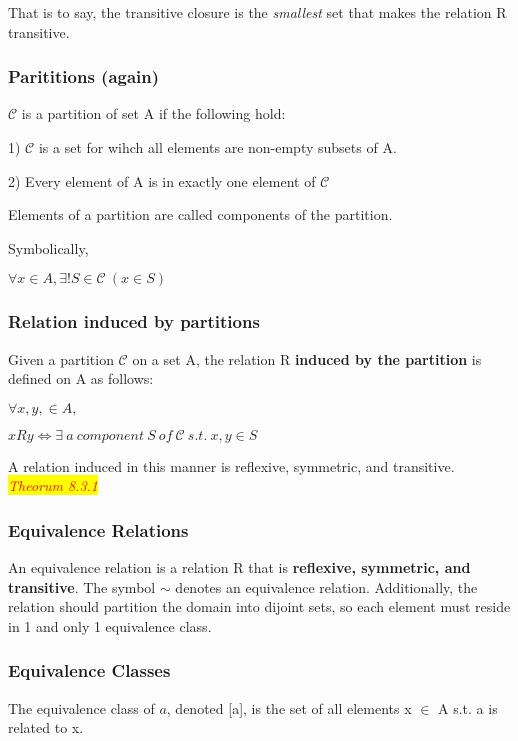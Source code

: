 \documentclass{article}
\newcommand{\theorum}[1]{\quad \quad \colorbox{yellow}{\textit{\textcolor{red}{Theorum #1}}}}
\begin{document}
\vspace{10pt}

That is to say, the transitive closure is the \textit{smallest} set that makes the relation R transitive.

\subsubsection{Parititions (again)}
$\mathcal{C}$ is a partition of set A if the following hold:

1) $\mathcal{C}$ is a set for wihch all elements are non-empty subsets of A.

2) Every element of A is in exactly one element of $\mathcal{C}$

Elements of a partition are called components of the partition.

Symbolically,
\begin{center}
    $\forall x \in A, \exists!S\in\mathcal{C}\ (x \in S)$
\end{center}

\subsubsection{Relation induced by partitions}
Given a partition $\mathcal{C}$ on a set A, the relation R \textbf{induced by the partition} is defined on A as follows:
\begin{center}
    $\forall x,y, \in A,$
    
    $xRy \iff \exists\ a\ component\ S\ of\ \mathcal{C}\ s.t.\ x,y \in S$
    
\end{center}

A relation induced in this manner is reflexive, symmetric, and transitive. \theorum{8.3.1}

\subsubsection{Equivalence Relations}
An equivalence relation is a relation R that is \textbf{reflexive, symmetric, and transitive}. The symbol $\sim$ denotes an equivalence relation. Additionally, the relation should partition the domain into dijoint sets, so each element must reside in 1 and only 1 equivalence class.

\subsubsection{Equivalence Classes}
The equivalence class of $a$, denoted [a], is the set of all elements x $\in$ A s.t. a is ~ related to x.
\end{document}
